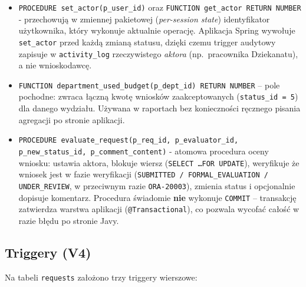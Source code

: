 \documentclass[12pt,a4paper]{article}
\begin{document}
\begin{itemize}[leftmargin=*]
  \item \texttt{PROCEDURE set\_actor(p\_user\_id)} oraz
        \texttt{FUNCTION get\_actor RETURN NUMBER} - przechowują w zmiennej
        pakietowej (\emph{per-session state}) identyfikator użytkownika,
        który wykonuje aktualnie operację. Aplikacja Spring wywołuje
        \texttt{set\_actor} przed każdą zmianą statusu, dzięki czemu trigger
        audytowy zapisuje w \texttt{activity\_log} rzeczywistego \emph{aktora}
        (np.\ pracownika Dziekanatu), a nie wnioskodawcę.
  \item \texttt{FUNCTION department\_used\_budget(p\_dept\_id) RETURN NUMBER}
        -- pole pochodne: zwraca łączną kwotę wniosków zaakceptowanych
        (\texttt{status\_id = 5}) dla danego wydziału. Używana w raportach
        bez konieczności ręcznego pisania agregacji po stronie aplikacji.
  \item \texttt{PROCEDURE evaluate\_request(p\_req\_id, p\_evaluator\_id,
        p\_new\_status\_id, p\_comment\_content)} - atomowa procedura oceny
        wniosku: ustawia aktora, blokuje wiersz (\texttt{SELECT \ldots FOR UPDATE}),
        weryfikuje że wniosek jest w fazie weryfikacji (\texttt{SUBMITTED /
        FORMAL\_EVALUATION / UNDER\_REVIEW}, w przeciwnym razie
        \texttt{ORA-20003}), zmienia status i opcjonalnie dopisuje komentarz.
        Procedura świadomie \textbf{nie} wykonuje \texttt{COMMIT} --
        transakcję zatwierdza warstwa aplikacji (\texttt{@Transactional}),
        co pozwala wycofać całość w razie błędu po stronie Javy.
\end{itemize}

\subsection{Triggery (V4)}
Na tabeli \texttt{requests} założono trzy triggery wierszowe:
\end{document}
